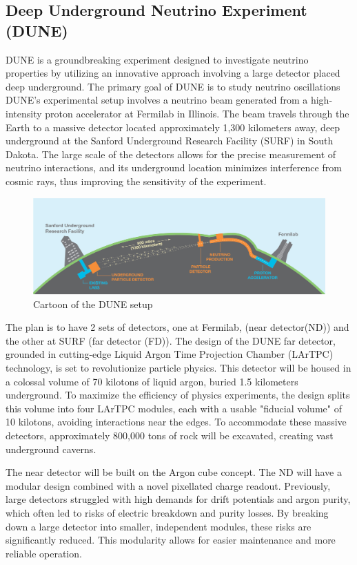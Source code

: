 \subsection{Deep Underground Neutrino Experiment (DUNE)}

DUNE is a groundbreaking experiment designed to investigate neutrino properties by utilizing an innovative approach involving a large detector placed deep underground.
The primary goal of DUNE is to study neutrino oscillations
DUNE's experimental setup involves a neutrino beam generated from a high-intensity proton accelerator at Fermilab in Illinois.
The beam travels through the Earth to a massive detector located approximately 1,300 kilometers away, deep underground at the Sanford Underground Research Facility (SURF) in South Dakota.
The large scale of the detectors allows for the precise measurement of neutrino interactions, and its underground location minimizes interference from cosmic rays, thus improving the sensitivity of the experiment.

\begin{figure}[H]
  \centering
  \includegraphics[width=120mm]{figures/dune.png}
  \caption{Cartoon of the DUNE setup}
  \label{dune}
\end{figure}

The plan is to have 2 sets of detectors, one at Fermilab, (near detector(ND)) and the other at SURF (far detector (FD)).
The design of the DUNE far detector, grounded in cutting-edge Liquid Argon Time Projection Chamber (LArTPC) technology, is set to revolutionize particle physics.
This detector will be housed in a colossal volume of 70 kilotons of liquid argon, buried 1.5 kilometers underground.
To maximize the efficiency of physics experiments, the design splits this volume into four LArTPC modules, each with a usable "fiducial volume" of 10 kilotons, avoiding interactions near the edges.
To accommodate these massive detectors, approximately 800,000 tons of rock will be excavated, creating vast underground caverns.

The near detector will be built on the Argon cube concept.
The ND will have a modular design combined with a novel pixellated charge readout.
Previously, large detectors struggled with high demands for drift potentials and argon purity, which often led to risks of electric breakdown and purity losses.
By breaking down a large detector into smaller, independent modules, these risks are significantly reduced.
This modularity allows for easier maintenance and more reliable operation.

